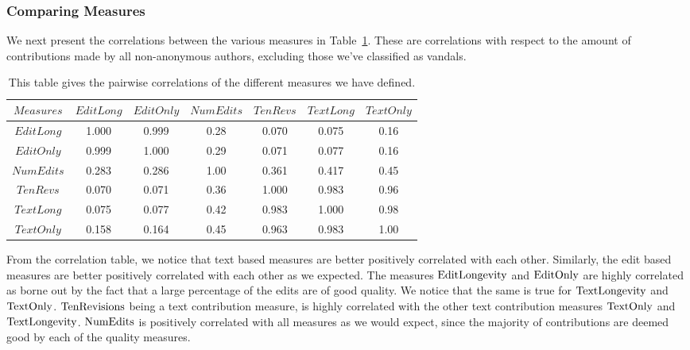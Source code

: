 \subsubsection*{Comparing Measures}

We next present the correlations between the various measures
in Table~\ref{cor-tab}.
These are correlations with respect to the amount of contributions
made by all non-anonymous authors, excluding those we've classified
as vandals.  
%
\begin{table}[!tp]
\begin{center}
\begin{tabular}{|c||c|c|c|c|c|c|}
	\hline
$Measures$ &  $EditLong$ & $EditOnly$ & $NumEdits$ & $TenRevs$ & $TextLong$ & $TextOnly$ \\
        \hline \hline
$EditLong$         &  1.000  & 0.999  &  0.28  &         0.070  & 0.075  &  0.16  \\
$EditOnly$         &  0.999  & 1.000  &  0.29  &         0.071  & 0.077  &  0.16  \\
$NumEdits$         &  0.283  & 0.286  &  1.00  &         0.361  & 0.417  &  0.45  \\
$TenRevs$          &  0.070  & 0.071  &  0.36  &         1.000  & 0.983  &  0.96  \\
$TextLong$         &  0.075  & 0.077  &  0.42  &         0.983  & 1.000  &  0.98  \\
$TextOnly$         &  0.158  & 0.164  &  0.45  &         0.963  & 0.983  &  1.00  \\
        \hline
\end{tabular}
\end{center}
\caption[Correlations of our measures]{
This table gives the pairwise correlations of the different measures we 
have defined.
}\label{cor-tab}
\end{table}
%
From the correlation table, we notice that text based measures are
better positively correlated with each other.
Similarly, the edit based measures are better positively correlated 
with each other as we expected.
The measures $\text{EditLongevity}$ and $\text{EditOnly}$ are highly correlated as 
borne out by the fact that a large percentage of the edits are of
good quality.
We notice that the same is true for $\text{TextLongevity}$ and $\text{TextOnly}$.
$\text{TenRevisions}$ being a text contribution measure, is highly correlated
with the other text contribution measures $\text{TextOnly}$ and
$\text{TextLongevity}$.
$\text{NumEdits}$ is positively correlated with all measures as we would
expect, since the majority of contributions are deemed good by
each of the quality measures.


